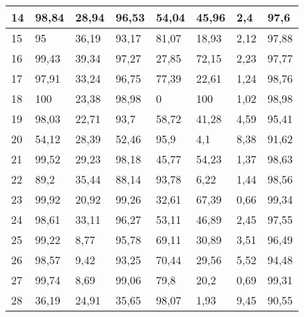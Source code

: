 \begin{longtable}[c]{|l|l|l|l|l|l|l|l|}
14              & 98,84        & 28,94        & 96,53       & 54,04         & 45,96         & 2,4           & 97,6          \\ \hline
15              & 95           & 36,19        & 93,17       & 81,07         & 18,93         & 2,12          & 97,88         \\ \hline
16              & 99,43        & 39,34        & 97,27       & 27,85         & 72,15         & 2,23          & 97,77         \\ \hline
17              & 97,91        & 33,24        & 96,75       & 77,39         & 22,61         & 1,24          & 98,76         \\ \hline
18              & 100          & 23,38        & 98,98       & 0             & 100           & 1,02          & 98,98         \\ \hline
19              & 98,03        & 22,71        & 93,7        & 58,72         & 41,28         & 4,59          & 95,41         \\ \hline
20              & 54,12        & 28,39        & 52,46       & 95,9          & 4,1           & 8,38          & 91,62         \\ \hline
21              & 99,52        & 29,23        & 98,18       & 45,77         & 54,23         & 1,37          & 98,63         \\ \hline
22              & 89,2         & 35,44        & 88,14       & 93,78         & 6,22          & 1,44          & 98,56         \\ \hline
23              & 99,92        & 20,92        & 99,26       & 32,61         & 67,39         & 0,66          & 99,34         \\ \hline
24              & 98,61        & 33,11        & 96,27       & 53,11         & 46,89         & 2,45          & 97,55         \\ \hline
25              & 99,22        & 8,77         & 95,78       & 69,11         & 30,89         & 3,51          & 96,49         \\ \hline
26              & 98,57        & 9,42         & 93,25       & 70,44         & 29,56         & 5,52          & 94,48         \\ \hline
27              & 99,74        & 8,69         & 99,06       & 79,8          & 20,2          & 0,69          & 99,31         \\ \hline
28              & 36,19        & 24,91        & 35,65       & 98,07         & 1,93          & 9,45          & 90,55         \\ \hline

\end{longtable}
